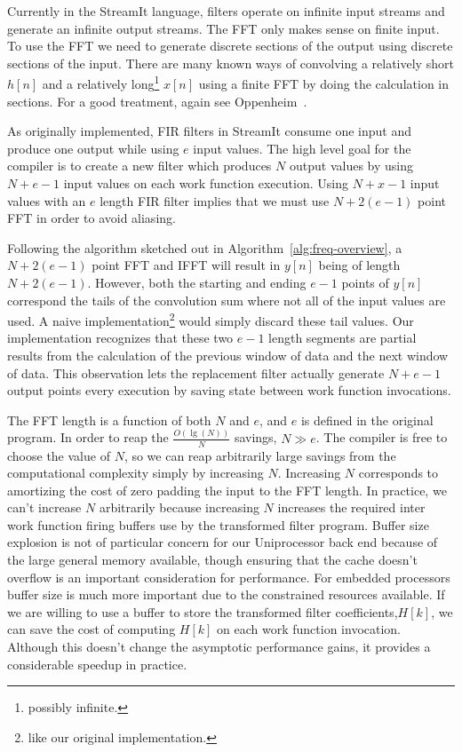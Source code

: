 Currently in the StreamIt language, filters operate on infinite input streams 
and generate an infinite output streams.
The FFT only makes sense on finite input. To use the FFT we need to
generate discrete sections of the output using discrete sections of the input.
There are many known ways of convolving a relatively
short $h[n]$ and a relatively long\footnote{possibly infinite.} 
$x[n]$ using a finite FFT by doing the calculation in sections. 
For a good treatment, again see Oppenheim~\cite{oppenheim-discrete}. 

As originally implemented, FIR filters in StreamIt consume one input and 
produce one output while using $e$ input values. The high level goal for the compiler
is to create a new filter which produces $N$ output values by using $N+e-1$ input
values on each work function execution. 
Using $N+x-1$ input values with an $e$ length FIR filter implies that we
must use $N+2(e-1)$ point FFT in order to avoid aliasing.

Following the algorithm sketched out in Algorithm~\ref{alg:freq-overview},
a $N+2(e-1)$ point FFT and IFFT will result in $y[n]$ being of length $N+2(e-1)$.
However, both the starting and ending $e-1$ points of $y[n]$ correspond
the tails of the convolution sum where not all of the input values are used. 
A naive implementation\footnote{like our original implementation.} would
simply discard these tail values. Our implementation recognizes that these
two $e-1$ length segments are partial results from the calculation
of the previous window of data and the next window of data. This observation
lets the replacement filter actually generate $N+e-1$ output points every execution
by saving state between work function invocations.

The FFT length is a function of both $N$ and $e$, and $e$ is defined in the
original program. In order to reap the $\frac{O(\lg(N))}{N}$ savings, 
$N \gg e$. The compiler is free to choose the value of $N$, 
so we can reap arbitrarily large savings from the computational complexity 
simply by increasing $N$. Increasing $N$ corresponds to amortizing the cost of 
zero padding the input to the FFT length. In practice, we can't increase $N$ 
arbitrarily because increasing $N$ increases the required inter work function
firing buffers use by the transformed filter program. Buffer size explosion is
not of particular concern for our Uniprocessor back end because of the large
general memory available, though ensuring that the cache doesn't overflow is
an important consideration for performance. For embedded processors 
buffer size is much more important due to the constrained resources available.
If we are willing to use a buffer to store the transformed filter coefficients,$H[k]$, 
we can save the cost of computing $H[k]$ on each work function invocation.
Although this doesn't change the asymptotic performance gains, it provides
a considerable speedup in practice.

